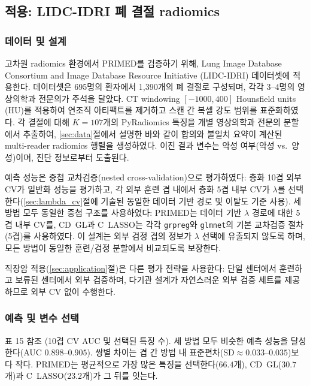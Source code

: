 \documentclass[a4paper,11pt]{article}
\begin{document}
\subsection{적용: LIDC-IDRI 폐 결절 radiomics}\label{sec:lidc}

\subsubsection{데이터 및 설계}

고차원 radiomics 환경에서 PRIMED를 검증하기 위해, Lung Image Database Consortium and Image Database Resource Initiative (LIDC-IDRI) 데이터셋에 적용한다.
데이터셋은 695명의 환자에서 1,390개의 폐 결절로 구성되며, 각각 3--4명의 영상의학과 전문의가 주석을 달았다.
CT windowing $[-1000, 400]$ Hounsfield units (HU)를 적용하여 연조직 아티팩트를 제거하고 스캔 간 복셀 강도 범위를 표준화하였다.
각 결절에 대해 $K = 107$개의 PyRadiomics 특징을 개별 영상의학과 전문의 분할에서 추출하여, \ref{sec:data}절에서 설명한 바와 같이 합의와 불일치 요약이 계산된 multi-reader radiomics 행렬을 생성하였다.
이진 결과 변수는 악성 여부(악성 vs.\ 양성)이며, 진단 정보로부터 도출된다.

예측 성능은 중첩 교차검증(nested cross-validation)으로 평가하였다: 층화 10겹 외부 CV가 일반화 성능을 평가하고, 각 외부 훈련 겹 내에서 층화 5겹 내부 CV가 $\lambda$를 선택한다(\ref{sec:lambda_cv}절에 기술된 동일한 데이터 기반 경로 및 이탈도 기준 사용).
세 방법 모두 동일한 중첩 구조를 사용하였다: PRIMED는 데이터 기반 $\lambda$ 경로에 대한 5겹 내부 CV를, CD~GL과 C~LASSO는 각각 \texttt{grpreg}와 \texttt{glmnet}의 기본 교차검증 절차(5겹)를 사용하였다.
이 설계는 외부 검정 겹의 정보가 $\lambda$ 선택에 유출되지 않도록 하며, 모든 방법이 동일한 훈련/검정 분할에서 비교되도록 보장한다.

직장암 적용(\ref{sec:application}절)은 다른 평가 전략을 사용한다: 단일 센터에서 훈련하고 보류된 센터에서 외부 검증하며, 다기관 설계가 자연스러운 외부 검증 세트를 제공하므로 외부 CV 없이 수행한다.

\subsubsection{예측 및 변수 선택}

표 15 참조 (10겹 CV AUC 및 선택된 특징 수).
세 방법 모두 비슷한 예측 성능을 달성한다(AUC $0.898$--$0.905$). 쌍별 차이는 겹 간 방법 내 표준편차($\mathrm{SD} \approx 0.033$--$0.035$)보다 작다.
PRIMED는 평균적으로 가장 많은 특징을 선택한다($66.4$개), CD~GL($30.7$개)과 C~LASSO($23.2$개)가 그 뒤를 잇는다.
\end{document}
